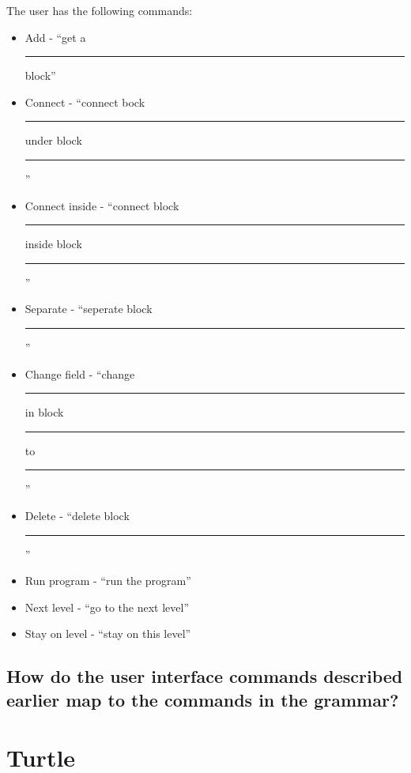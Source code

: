 \documentclass[]{article}
\newcommand{\uline}[1]{\rule[0pt]{#1}{0.4pt}}
\begin{document}
The user has the following commands: 
\begin{itemize}
  \item Add  - ``get a \uline{1cm} block''
  \item Connect - ``connect bock \uline{.5cm} under block \uline{.5cm}''
  \item Connect inside - ``connect block \uline{.5cm} inside block \uline{.5cm}''
  \item Separate - ``seperate block \uline{.5cm}''
  \item Change field - ``change \uline{.5cm} in block \uline{.5cm} to \uline{.5cm}''
  \item Delete - ``delete block \uline{.5cm}''
  \item Run program - ``run the program''
  \item Next level - ``go to the next level''
  \item Stay on level - ``stay on this level''
\end{itemize}
\subsection{How do the user interface commands described earlier map to the 
commands in the grammar?}


\section{Turtle}

\end{document}
